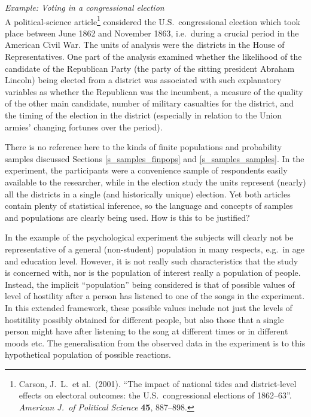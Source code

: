 \emph{Example: Voting in a congressional election}\\
A political-science article\footnote{ Carson, J.\ L.\ et al.\ (2001).
``The impact of national tides and district-level effects on electoral
outcomes: the U.S.\ congressional elections of 1862--63''.
\emph{American J.\ of Political Science} \textbf{45}, 887--898.}
considered the U.S.\ congressional election which took place between
June 1862 and November 1863, i.e.\ during a crucial period in the
American Civil War. The units of analysis were the districts
in the House of Representatives. One part of the analysis examined whether the
likelihood of the candidate of the Republican Party (the party of the
sitting president Abraham Lincoln) being elected from a district was
associated with such explanatory variables as whether the Republican was
the incumbent, a measure of the quality of the other main candidate,
number of military casualties for the district, and the timing of the
election in the district (especially in relation to the Union armies'
changing fortunes over the period).

There is no reference here to the kinds of finite populations and
probability samples discussed Sections \ref{s_samples_finpops} and
\ref{s_samples_samples}. In the  experiment, the
participants were a convenience sample of respondents easily
available to the researcher, while in the election study the units
represent (nearly) all the districts in a single (and historically
unique) election. Yet both articles contain plenty of statistical
inference, so the language and concepts of samples and populations are
clearly being used. How is this to be justified?

In the example of the psychological experiment the subjects will clearly
not be representative of a general (non-student) population in many
respects, e.g.\ in age and education level. However, it
is not really such characteristics that the study is concerned with, nor
is the population of interest really a population of people. Instead,
the implicit ``population'' being considered is that of possible values
of level of hostility after a person has
listened to one of the songs in the experiment. In this extended
framework, these possible values include not just the levels of
hostitility possibly obtained for different people, but also those that
a single person might have after listening to the song at different
times or in different moods etc. The generalisation from the observed
data in the experiment is to this hypothetical population of possible
reactions.

